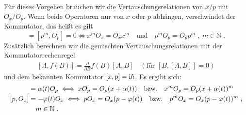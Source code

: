   Für dieses Vorgehen brauchen wir die Vertauschungsrelationen von $x/p$ mit $O_x/O_p$.
  Wenn beide Operatoren nur von $x$ oder $p$ abhängen, verschwindet der Kommutator, das heißt es gilt
  \begin{equation}
    [x^m,O_x]=[p^m,O_p]=0\iff x^mO_x=O_xx^m\quad\text{und}\quad p^mO_p=O_pp^m\;,\; m \in \mathbb{N} \; .
  \end{equation}
  Zusätzlich berechnen wir die gemischten Vertauschungsrelationen mit der Kommutatorrechenregel
  \begin{align}
    [A,f(B)]=\frac{\partial}{\partial B}f(B)[A,B]\quad (\text{für $[B,[A,B]]=0$})
  \end{align}
  und dem bekannten Kommutator $[x,p]=\text i \hbar$.
  Es ergibt sich:
  \begin{align}
    [x,O_p]&=\alpha(t)O_p\iff xO_p=O_p(x+\alpha(t))\quad\text{bzw.}\quad
    x^mO_p=O_p(x+\alpha(t))^m \label{kommutator_1}\\
    [p,O_x]&=-\varphi(t)O_x\iff pO_x=O_x(p-\varphi(t))\quad\text{bzw.}\quad
    p^mO_x=O_x(p-\varphi(t))^m \;, \label{kommutator_2} \\
    &\quad m \in \mathbb{N} \;. \notag
  \end{align}

